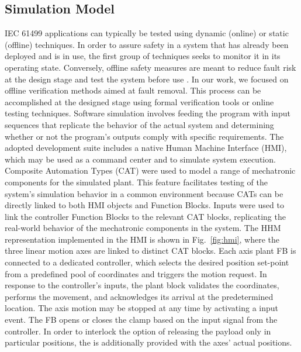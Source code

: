 \begin{bibunit}
\section{Simulation Model}
\label{sec:simulation}
IEC 61499 applications can typically be tested using dynamic (online) or static (offline) techniques. In order to assure safety in a system that has already been deployed and is in use, the first group of techniques seeks to monitor it in its operating state. Conversely, offline safety measures are meant to reduce fault risk at the design stage and test the system before use \cite{Ovsiannikova2021b}.
In our work, we focused on offline verification methods aimed at fault removal. 
This process can be accomplished at the designed stage using formal verification tools or online testing techniques. 
Software simulation involves feeding the program with input sequences that replicate the behavior of the actual system and determining whether or not the program's outputs comply with specific requirements.
The adopted development suite includes a native Human Machine Interface (HMI), which may be used as a command center and to simulate system execution.
Composite Automation Types (CAT) were used to model a range of mechatronic components for the simulated plant. This feature facilitates testing of the system's simulation behavior in a common environment because CATs can be directly linked to both HMI objects and Function Blocks.
Inputs were used to link the controller Function Blocks to the relevant CAT blocks, replicating the real-world behavior of the mechatronic components in the system. The HHM representation implemented in the HMI is shown in \mbox{Fig. \ref{fig:hmi}}, where the three linear motion axes are linked to distinct CAT blocks. 
Each axis plant FB is connected to a dedicated  controller, which selects the desired position set-point from a predefined pool of coordinates and triggers the motion request. In response to the controller's inputs, the plant block validates the coordinates, performs the movement, and acknowledges its arrival at the predetermined location. The axis motion may be stopped at any time by activating a  input event.
The  FB opens or closes the clamp based on the input signal from the controller. In order to interlock the option of releasing the payload only in particular positions, the  is additionally provided with the axes' actual positions.


\end{bibunit}
